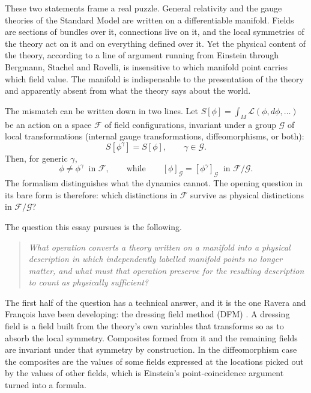 \documentclass[11pt]{article}
\theoremstyle{plain}
\theoremstyle{definition}
\theoremstyle{remark}
\newcommand{\F}{\mathcal F}
\newcommand{\G}{\mathcal G}
\begin{document}
These two statements frame a real puzzle. General relativity and the gauge theories of the Standard Model are written on a differentiable manifold. Fields are sections of bundles over it, connections live on it, and the local symmetries of the theory act on it and on everything defined over it. Yet the physical content of the theory, according to a line of argument running from Einstein through Bergmann, Stachel and Rovelli, is insensitive to which manifold point carries which field value. The manifold is indispensable to the presentation of the theory and apparently absent from what the theory says about the world.

The mismatch can be written down in two lines. Let $S[\phi]=\int_M\mathcal L(\phi,d\phi,\dots)$ be an action on a space $\F$ of field configurations, invariant under a group $\G$ of local transformations (internal gauge transformations, diffeomorphisms, or both):
\begin{equation}
S[\phi^\gamma]=S[\phi],\qquad \gamma\in\G .
\end{equation}
Then, for generic $\gamma$,
\begin{equation}\label{eq:mismatch}
\phi\neq\phi^\gamma\ \text{ in } \F,
\qquad\text{while}\qquad
[\phi]_\G=[\phi^\gamma]_\G\ \text{ in } \F/\G .
\end{equation}
The formalism distinguishes what the dynamics cannot. The opening question in its bare form is therefore: which distinctions in $\F$ survive as physical distinctions in $\F/\G$?

The question this essay pursues is the following.

\begin{quote}
\emph{What operation converts a theory written on a manifold into a physical description in which independently labelled manifold points no longer matter, and what must that operation preserve for the resulting description to count as physically sufficient?}
\end{quote}

The first half of the question has a technical answer, and it is the one Ravera and François have been developing: the dressing field method (DFM) \cite{ravera-notes,fr-grf,fr-meaning}. A dressing field is a field built from the theory's own variables that transforms so as to absorb the local symmetry. Composites formed from it and the remaining fields are invariant under that symmetry by construction. In the diffeomorphism case the composites are the values of some fields expressed at the locations picked out by the values of other fields, which is Einstein's point-coincidence argument turned into a formula.
\end{document}
